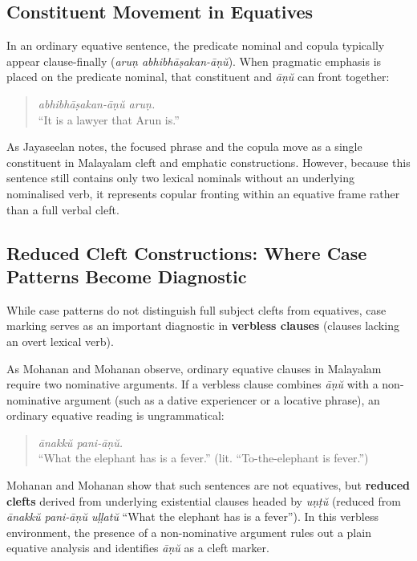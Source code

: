\subsection{Constituent Movement in Equatives}
\label{sec:equative_movement}

In an ordinary equative sentence, the predicate nominal and copula typically appear clause-finally (\textit{aruṇ abhibhāṣakan-āṇŭ}). When pragmatic emphasis is placed on the predicate nominal, that constituent and \textit{āṇŭ} can front together:
\begin{quote}
\textit{abhibhāṣakan-āṇŭ aruṇ.}\\
``It is a lawyer that Arun is.''
\end{quote}
As Jayaseelan \citep{jayaseelan2023dravidian} notes, the focused phrase and the copula move as a single constituent in Malayalam cleft and emphatic constructions. However, because this sentence still contains only two lexical nominals without an underlying nominalised verb, it represents copular fronting within an equative frame rather than a full verbal cleft.

\subsection{Reduced Cleft Constructions: Where Case Patterns Become Diagnostic}
\label{sec:reduced_clefts}

While case patterns do not distinguish full subject clefts from equatives, case marking serves as an important diagnostic in \textbf{verbless clauses} (clauses lacking an overt lexical verb).

As Mohanan and Mohanan \citep{mohanan1999two} observe, ordinary equative clauses in Malayalam require two nominative arguments. If a verbless clause combines \textit{āṇŭ} with a non-nominative argument (such as a dative experiencer or a locative phrase), an ordinary equative reading is ungrammatical:
\begin{quote}
\textit{ānakkŭ pani-āṇŭ.}\\
``What the elephant has is a fever.'' (lit. ``To-the-elephant is fever.'')
\end{quote}
Mohanan and Mohanan show that such sentences are not equatives, but \textbf{reduced clefts} derived from underlying existential clauses headed by \textit{uṇṭŭ} (reduced from \textit{ānakkŭ pani-āṇŭ uḷḷatŭ} ``What the elephant has is a fever''). In this verbless environment, the presence of a non-nominative argument rules out a plain equative analysis and identifies \textit{āṇŭ} as a cleft marker.

